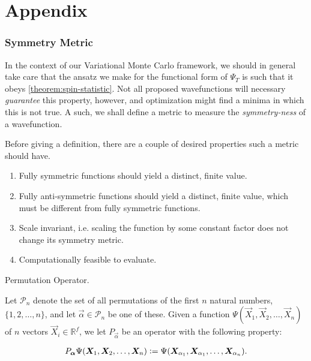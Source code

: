 \documentclass[Thesis.tex]{subfiles}
\begin{document}
\chapter{Appendix}

\subsection{Symmetry Metric}

In the context of our Variational Monte Carlo framework, we should in general
take care that the ansatz we make for the functional form of $\Psi_T$ is such
that it obeys \autoref{theorem:spin-statistic}. Not all proposed wavefunctions
will necessary \emph{guarantee} this property, however, and optimization might
find a minima in which this is not true. A such, we shall define a metric to
measure the \emph{symmetry-ness} of a wavefunction.

Before giving a definition, there are a couple of desired properties such a
metric should have.

\begin{enumerate}
    \item Fully symmetric functions should yield a distinct, finite value.
    \item Fully anti-symmetric functions should yield a distinct, finite value,
        which must be different from fully symmetric functions.
    \item Scale invariant, i.e. scaling the function by
        some constant factor does not change its symmetry metric.
    \item Computationally feasible to evaluate.
\end{enumerate}

\begin{definition}{Permutation Operator.}

     Let $\mathcal{P}_n$ denote the set of all permutations of the first $n$
     natural numbers, $\{1, 2, \dots, n\}$, and let $\vec\alpha\in \mathcal{P}_n$
     be one of these. Given a function $\Psi(\vec X_1, \vec X_2,\dots,\vec X_n)$ of
     $n$ vectors $\vec X_i\in \mathbb{R}^f$, we let $P_{\vec\alpha}$ be an
     operator with the following property:

    \begin{align}
        P_{\bm{\alpha}}\Psi(\bm{X}_1,\bm{X}_2,\dots,\bm{X}_n)
        \vcentcolon=
        \Psi(\bm{X}_{\alpha_1},\bm{X}_{\alpha_1},\dots,\bm{X}_{\alpha_n}).
    \end{align}
\end{definition}
\end{document}
